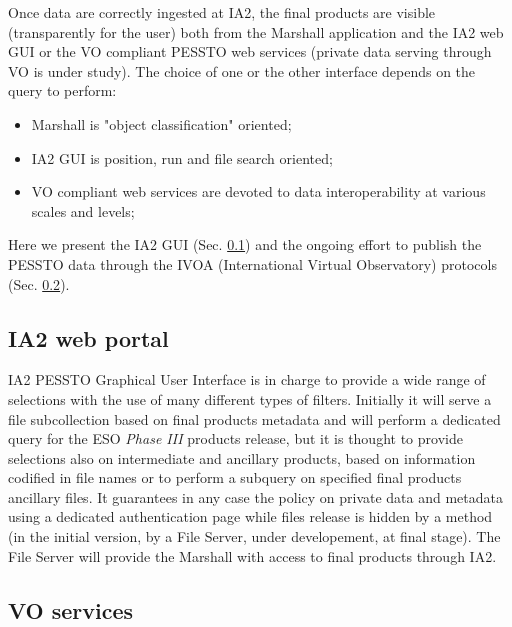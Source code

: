 \documentclass[11pt,twoside]{article}
\begin{document}
Once data are correctly ingested at IA2, the final products are visible (transparently for the user) both from the Marshall application and the IA2 web GUI or the VO compliant PESSTO web services (private data serving through VO is under study). The choice of one or the other interface depends on the query to perform:
\begin{itemize}[noitemsep,nolistsep]
	\item Marshall is "object classification" oriented;
	\item IA2 GUI is position, run and file search oriented;
	\item VO compliant web services are devoted to data interoperability at various scales and levels;
\end{itemize} 
Here we present the IA2 GUI (Sec. \ref{ia2web}) and the ongoing effort to publish the PESSTO data through the IVOA (International Virtual Observatory) protocols (Sec. \ref{vo}).

\subsection{IA2 web portal}\label{ia2web}

IA2 PESSTO Graphical User Interface is in charge to provide a wide range of selections with the use of many different types of filters. Initially it will serve a file subcollection based on final products metadata and will perform a dedicated query for the ESO \textit{Phase III} products release, but it is thought to provide selections also on intermediate and ancillary products, based on information codified in file names or to perform a subquery on specified final products ancillary files. 
It guarantees in any case the policy on private data and metadata using a dedicated authentication page while files release is hidden by a method (in the initial version, by a File Server, under developement, at final stage). The File Server will provide the Marshall with access to final products through IA2.
\subsection{VO services}\label{vo}
\end{document}
